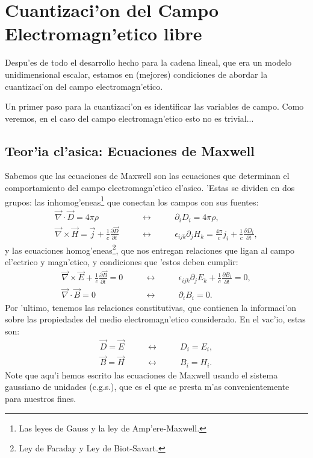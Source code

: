 \chapter{Cuantizaci'on del Campo Electromagn'etico libre}

Despu'es de todo el desarrollo hecho para la cadena lineal, que era un modelo
unidimensional escalar, estamos en (mejores) condiciones de abordar la
cuantizaci'on del campo electromagn'etico.

Un primer paso para la cuantizaci'on es identificar las variables de campo. Como
veremos, en el caso del campo electromagn'etico esto no es trivial...

\section{Teor'ia cl'asica: Ecuaciones de Maxwell}

Sabemos que las ecuaciones de Maxwell son las ecuaciones que determinan
el comportamiento del campo electromagn'etico cl'asico. 'Estas se
dividen en dos grupos: las inhomog'eneas\footnote{Las leyes de Gauss y
la ley de Amp'ere-Maxwell.} que conectan los campos con sus fuentes: 
\begin{eqnarray}
\overrightarrow{\nabla}\cdot\overrightarrow{D}  =4\pi \rho\qquad
&\longleftrightarrow&\qquad\partial_{i}D_{i}=4\pi\rho ,\label{Ley de Gauss}\\
\overrightarrow{\nabla}\times\overrightarrow{H}  = \overrightarrow{j}
+\frac{1}{c}\frac{\partial\overrightarrow{D}}{\partial
t}\qquad&\longleftrightarrow&
\qquad\epsilon_{ijk}\partial_{j}H_{k}=\frac{4\pi}{c}j_{i}+\frac{1}{c}\frac{
\partial D_{i}}{\partial
t} ,\label{Ley de Ampere-Maxwell}
\end{eqnarray}
y las ecuaciones homog'eneas\footnote{Ley de Faraday y Ley de Biot-Savart.}, que
nos entregan relaciones que ligan al campo el'ectrico y magn'etico, y
condiciones que 'estos deben cumplir:
\begin{eqnarray}
\overrightarrow{\nabla}\times\overrightarrow{E}+\frac{1}{c}\frac{
\partial\overrightarrow
{B}}{\partial t}  = 0\qquad&\longleftrightarrow&\qquad\epsilon_{ijk}
\partial_{j}E_{k}+\frac{1}{c}\frac{\partial B_{i}}{\partial t}=0 ,\label{Ley de
Faraday}\\
\overrightarrow{\nabla}\cdot\overrightarrow{B}  = 0\qquad&\longleftrightarrow&
\qquad\partial_{i}B_{i}=0 .\label{Ley de Biot-Savart}
\end{eqnarray}
Por 'ultimo, tenemos las relaciones constitutivas, que contienen la informaci'on
sobre las propiedades del medio electromagn'etico considerado. En el vac'io,
estas son:
\begin{eqnarray}
\overrightarrow{D}  = \overrightarrow{E}\qquad
&\longleftrightarrow&\qquad D_{i}=E_{i} ,\label{ecuacion-Constitutiva-1}
\\
\overrightarrow{B}  = \overrightarrow{H}\qquad&\longleftrightarrow&
\qquad B_{i}=H_{i} .\label{ecuacion-Constitutiva-2}
\end{eqnarray}
Note que aqu'i hemos escrito las ecuaciones de Maxwell usando el sistema
gaussiano de unidades (c.g.s.), que es el que se presta m'as convenientemente
para nuestros fines.

